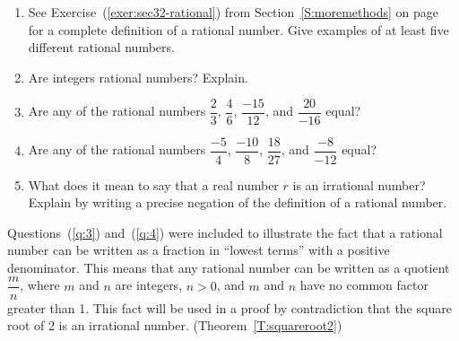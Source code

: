%
\hbreak
%
\begin{previewactivity} \label{PA:rational} \hfill
\begin{enumerate}

  \item See Exercise~(\ref{exer:sec32-rational}) from Section~\ref{S:moremethods} on 
page~\pageref{exer:sec32-rational} for a complete definition of a rational number.  Give examples of at least five different rational numbers.

  \item Are integers rational numbers?  Explain.

  \item Are any of the rational numbers $\dfrac{2}{3}$, $\dfrac{4}{6}$, $\dfrac{-15}{12}$, and $\dfrac{20}{-16}$ equal? %
\label{q:3}%

  \item Are any of the rational numbers $\dfrac{-5}{4}$, $\dfrac{-10}{8}$, $\dfrac{18}{27}$, and $\dfrac{-8}{-12}$ equal?%
\label{q:4}%

  \item What does it mean to say that a real number $r$ is an irrational number?  Explain by writing a precise negation of the definition of a rational number. 

\end{enumerate}
Questions~(\ref{q:3}) and~(\ref{q:4}) were included to illustrate the fact that a rational number can be written as a fraction in ``lowest terms'' with a positive denominator.  This means that any rational number can be written as a quotient $\dfrac{m}{n}$, where $m$ and $n$ are integers, $ n > 0 $, and $m$ and $n$ have no common factor greater than 1.  This fact will be used in a proof by contradiction that the square root of 2 is an irrational number.  (Theorem~\ref{T:squareroot2})
\end{previewactivity}
\hbreak

\endinput
